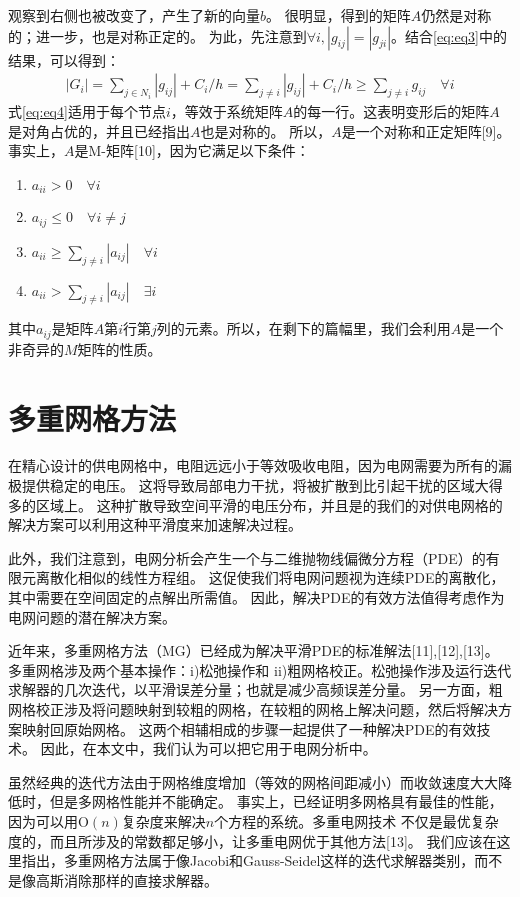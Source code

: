 观察到右侧也被改变了，产生了新的向量$b$。 很明显，得到的矩阵$A$仍然是对称的；进一步，也是对称正定的。 为此，先注意到$\forall i, |g_{ij}|=|g_{ji}|$。结合\ref{eq:eq3}中的结果，可以得到：
\begin{align}
|G_i| = \sum_{j\in N_i} |g_{ij}|+C_i/h=\sum_{j\neq i}|g_{ij}|+C_i/h\geq \sum_{j\neq i}g_{ij} \quad \forall i
\label{eq:eq4}
\end{align}
式\ref{eq:eq4}适用于每个节点$i$，等效于系统矩阵$A$的每一行。这表明变形后的矩阵$A$是对角占优的，并且已经指出$A$也是对称的。 所以，$A$是一个对称和正定矩阵[9]。 事实上，$A$是M-矩阵[10]，因为它满足以下条件：
\begin{enumerate}
\item $a_{ii}>0 \quad \forall i$
\item $a_{ij}\leq 0 \quad \forall i\neq j$
\item $a_{ii}\geq \sum_{j\neq i}|a_{ij}| \quad \forall i$
\item $a_{ii}>\sum_{j\neq i}|a_{ij}| \quad \exists i$
\end{enumerate}
其中$a_{ij}$是矩阵$A$第$i$行第$j$列的元素。所以，在剩下的篇幅里，我们会利用$A$是一个非奇异的$M$矩阵的性质。

\section{多重网格方法}

在精心设计的供电网格中，电阻远远小于等效吸收电阻，因为电网需要为所有的漏极提供稳定的电压。 这将导致局部电力干扰，将被扩散到比引起干扰的区域大得多的区域上。 这种扩散导致空间平滑的电压分布，并且是的我们的对供电网格的解决方案可以利用这种平滑度来加速解决过程。

此外，我们注意到，电网分析会产生一个与二维抛物线偏微分方程（PDE）的有限元离散化相似的线性方程组。 这促使我们将电网问题视为连续PDE的离散化，其中需要在空间固定的点解出所需值。 因此，解决PDE的有效方法值得考虑作为电网问题的潜在解决方案。

近年来，多重网格方法（MG）已经成为解决平滑PDE的标准解法[11],[12],[13]。 多重网格涉及两个基本操作：i)松弛操作和 ii)粗网格校正。松弛操作涉及运行迭代求解器的几次迭代，以平滑误差分量；也就是减少高频误差分量。 另一方面，粗网格校正涉及将问题映射到较粗的网格，在较粗的网格上解决问题，然后将解决方案映射回原始网格。 这两个相辅相成的步骤一起提供了一种解决PDE的有效技术。 因此，在本文中，我们认为可以把它用于电网分析中。

虽然经典的迭代方法由于网格维度增加（等效的网格间距减小）而收敛速度大大降低时，但是多网格性能并不能确定。 事实上，已经证明多网格具有最佳的性能，因为可以用O$(n)$复杂度来解决$n$个方程的系统。多重电网技术 不仅是最优复杂度的，而且所涉及的常数都足够小，让多重电网优于其他方法[13]。 我们应该在这里指出，多重网格方法属于像Jacobi和Gauss-Seidel这样的迭代求解器类别，而不是像高斯消除那样的直接求解器。

